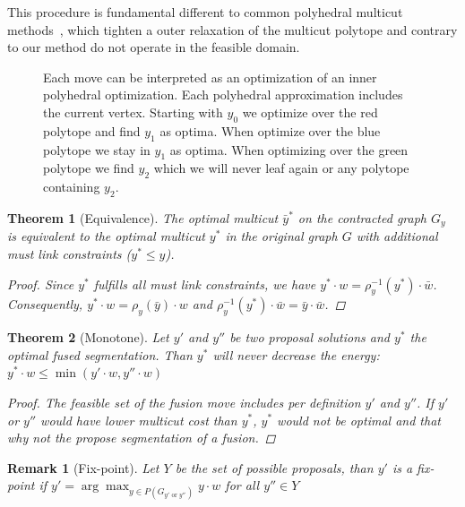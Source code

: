 \documentclass[10pt,twocolumn,letterpaper]{article}
\newtheorem{theorem}{Theorem}
\newtheorem{remark}{Remark}
\newcommand{\OR}{\textrm{ or }}
\begin{document}
This procedure is fundamental different to common polyhedral multicut methods~\cite{kappes_2011_emmcvpr,kappes_2013_arxiv}, 
which tighten a outer relaxation of the multicut polytope and contrary to our method do not operate in the feasible domain. 



\begin{figure}
\centering

\caption{Each move can be interpreted as an optimization of an inner polyhedral optimization.
Each polyhedral approximation includes the current vertex. Starting with $y_0$ we optimize over the red polytope 
and find $y_1$ as optima. When optimize over the blue polytope we stay in $y_1$ as optima.
When optimizing over the green polytope we find $y_2$ which we will never leaf again or any polytope containing $y_2$. 
}
\label{fig:polyheadral}
\end{figure}


\begin{theorem}[Equivalence]
The optimal multicut $\bar{y}^*$ on the contracted graph $G_y$
is equivalent to the optimal multicut $y^*$ in the original graph $G$ 
with additional must link constraints ($y^* \leq y$).
%
\begin{proof}
Since $y^*$ fulfills all  must link constraints, we have  $y^*\cdot w = \rho^{-1}_y(y^*)\cdot \bar{w}$.
Consequently, $y^*\cdot w = \rho_y(\bar{y}) \cdot w$ and  $\rho^{-1}_y(y^*)\cdot \bar{w}= \bar{y}\cdot\bar{w}$.
\end{proof}
%
\end{theorem}




\begin{theorem}[Monotone]
Let $y'$ and $y''$ be two proposal solutions and  $y^*$ the optimal fused segmentation.
Than $y^*$  will never decrease the energy:
$y^* \cdot w \leq  \min( y'\cdot w,  y''\cdot w) $ 
%
\begin{proof}
The feasible set of the fusion move includes per definition  $y'$ and $y''$.
If $y'$ or $y''$ would have lower multicut cost than $y^*$, $y^*$ would not be optimal 
and that why not the propose segmentation of a fusion.
\end{proof}
%
\end{theorem}

\begin{remark}[Fix-point]
Let $Y$ be the set of possible proposals, than
$y'$ is a fix-point if $y'=\arg\max_{y\in P(G_{y'\OR y''})} y\cdot w$ for all $y''\in Y$
\end{remark}
\end{document}
